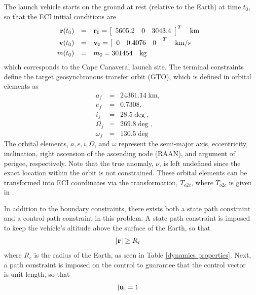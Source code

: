 \documentclass[10pt]{article}
\begin{document}
The launch vehicle starts on the ground at rest (relative to the Earth) at time $t_0$, so that the ECI initial conditions are
\begin{equation}\label{ICs}
\begin{array}{rcl}
{\bf r}(t_0) &=& {\bf r}_0 = \left[ \begin{array}{ccc} 5605.2 & 0 & 3043.4 \end{array} \right] ^T\quad \mbox{km} \vspace{3pt}\\
{\bf v}(t_0) &=& {\bf v}_0 = \left[ \begin{array}{ccc} 0 & 0.4076 & 0 \end{array} \right]^T \quad \mbox{km/s} \vspace{3pt}\\
m(t_0) &=& m_0 = 301454 \quad \mbox{kg}
\end{array}
\end{equation}
which corresponds to the Cape Canaveral launch site.  The terminal constraints
define the target geosynchronous transfer orbit (GTO), which is defined in
orbital elements as
\begin{equation}\label{FCs}
\begin{array}{rcl}
 a_f &=   &  24361.14 \; \mbox{km}, \\
 e_f &=   &  0.7308, \\
 i_f &=   &  28.5\deg,\\
 \Omega_f &= & 269.8\deg, \\
 \omega_f &= & 130.5\deg
\end{array}
\end{equation}
The orbital elements, $a,e,i,\Omega$, and $\omega$ represent the semi-major
axis, eccentricity, inclination, right ascension of the ascending node
(RAAN), and argument of perigee, respectively.  Note that the true anomaly,
$\nu$, is left undefined since the exact location within the orbit is not
constrained.  These orbital elements can be transformed into ECI coordinates
via the transformation, $T_{o2c}$, where $T_{o2c}$ is given in \cite{Bate1}.

In addition to the boundary constraints, there exists both a state path
constraint and a control path constraint in this problem.  A state path
constraint is imposed to keep the vehicle's altitude above the surface of the
Earth, so that
\begin{equation}\label{xpath}
|{\bf r}|\geq R_r
\end{equation}
where $R_e$ is the radius of the Earth, as seen in Table \ref{dynamics
  properties}.  Next, a path constraint is imposed on the control to guarantee
that the control vector is unit length, so that
\begin{equation}\label{upath}
|{\bf u}| = 1
\end{equation}
\end{document}

